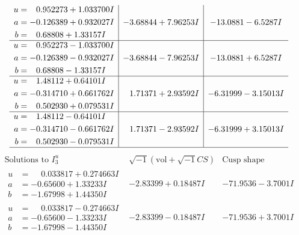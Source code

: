 \documentclass[1p]{elsarticle_modified}
\theoremstyle{definition}
\newcommand{\I}{\sqrt{-1}}
\begin{document}
$$\begin{array}{c|c|c}
\begin{aligned}
u &= \phantom{-}0.952273 + 1.033700 I \\
a &= -0.126389 + 0.932027 I \\
b &= \phantom{-}0.68808 + 1.33157 I\end{aligned}
 & -3.68844 + 7.96253 I & -13.0881 - 6.5287 I \\ \hline\begin{aligned}
u &= \phantom{-}0.952273 - 1.033700 I \\
a &= -0.126389 - 0.932027 I \\
b &= \phantom{-}0.68808 - 1.33157 I\end{aligned}
 & -3.68844 - 7.96253 I & -13.0881 + 6.5287 I \\ \hline\begin{aligned}
u &= \phantom{-}1.48112 + 0.64101 I \\
a &= -0.314710 + 0.661762 I \\
b &= \phantom{-}0.502930 + 0.079531 I\end{aligned}
 & \phantom{-}1.71371 + 2.93592 I & -6.31999 - 3.15013 I \\ \hline\begin{aligned}
u &= \phantom{-}1.48112 - 0.64101 I \\
a &= -0.314710 - 0.661762 I \\
b &= \phantom{-}0.502930 - 0.079531 I\end{aligned}
 & \phantom{-}1.71371 - 2.93592 I & -6.31999 + 3.15013 I\\
 \hline 
 \end{array}$$\newpage$$\begin{array}{c|c|c}  
\text{Solutions to }I^u_{3}& \I (\text{vol} + \sqrt{-1}CS) & \text{Cusp shape}\\
 \hline 
\begin{aligned}
u &= \phantom{-}0.033817 + 0.274663 I \\
a &= -0.65600 + 1.33233 I \\
b &= -1.67998 + 1.44350 I\end{aligned}
 & -2.83399 + 0.18487 I & -71.9536 - 3.7001 I \\ \hline\begin{aligned}
u &= \phantom{-}0.033817 - 0.274663 I \\
a &= -0.65600 - 1.33233 I \\
b &= -1.67998 - 1.44350 I\end{aligned}
 & -2.83399 - 0.18487 I & -71.9536 + 3.7001 I \\ \hline\begin{aligned}

\end{aligned}
\end{array}$$
\end{document}

